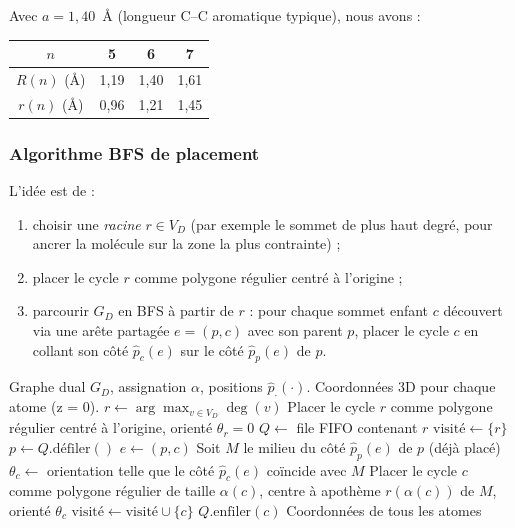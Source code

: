 \documentclass[12pt,a4paper]{article}
\theoremstyle{definition}
\theoremstyle{remark}
\newcommand{\GD}{G_{\!D}}
\newcommand{\VD}{V_{\!D}}
\newcommand{\degv}{\deg(v)}
\newcommand{\posIn}[2]{\hat{p}_{#1}(#2)}
\newcommand{\NN}{\mathcal{N}}
\begin{document}
Avec $a = 1{,}40$~\AA{} (longueur C--C aromatique typique), nous avons :
\begin{center}
\begin{tabular}{cccc}
\toprule
$n$ & 5 & 6 & 7 \\
\midrule
$R(n)$ (\AA) & 1{,}19 & 1{,}40 & 1{,}61 \\
$r(n)$ (\AA) & 0{,}96 & 1{,}21 & 1{,}45 \\
\bottomrule
\end{tabular}
\end{center}

\subsubsection{Algorithme BFS de placement}

L'id\'ee est de :
\begin{enumerate}[leftmargin=*]
  \item choisir une \emph{racine} $r \in \VD$ (par exemple le sommet
        de plus haut degr\'e, pour ancrer la mol\'ecule sur la zone la
        plus contrainte) ;
  \item placer le cycle $r$ comme polygone r\'egulier centr\'e \`a
        l'origine ;
  \item parcourir $\GD$ en BFS \`a partir de $r$ : pour chaque sommet
        enfant $c$ d\'ecouvert via une ar\^ete partag\'ee $e = (p, c)$
        avec son parent $p$, placer le cycle $c$ en \og collant \fg{}
        son c\^ot\'e $\posIn{c}{e}$ sur le c\^ot\'e $\posIn{p}{e}$ de $p$.
\end{enumerate}

\begin{algorithm}[!ht]
\caption{Phase B : placement g\'eom\'etrique par BFS sur $\GD$.}
\label{alg:bfs-placement}
\begin{algorithmic}[1]
\Require Graphe dual $\GD$, assignation $\alpha$, positions $\posIn{\cdot}{\cdot}$.
\Ensure Coordonn\'ees 3D pour chaque atome (z = 0).
\State $r \gets \arg\max_{v \in \VD} \degv$ 
\State Placer le cycle $r$ comme polygone r\'egulier centr\'e \`a l'origine, orient\'e $\theta_r = 0$
\State $Q \gets$ file FIFO contenant $r$
\State $\text{visit\'e} \gets \{r\}$
  \State $p \gets Q.\text{d\'efiler}()$
  \For{$c \in \NN(p)$ avec $c \notin \text{visit\'e}$}
    \State $e \gets (p, c)$
    \State Soit $M$ le milieu du c\^ot\'e $\posIn{p}{e}$ de $p$ (d\'ej\`a plac\'e)
    \State $\theta_c \gets$ orientation telle que le c\^ot\'e $\posIn{c}{e}$ co\"incide avec $M$
    \State Placer le cycle $c$ comme polygone r\'egulier de taille $\alpha(c)$, centre \`a apoth\`eme $r(\alpha(c))$ de $M$, orient\'e $\theta_c$
    \State $\text{visit\'e} \gets \text{visit\'e} \cup \{c\}$
    \State $Q.\text{enfiler}(c)$
  \EndFor
\EndWhile
\State \Return Coordonn\'ees de tous les atomes
\end{algorithmic}
\end{algorithm}
\end{document}
